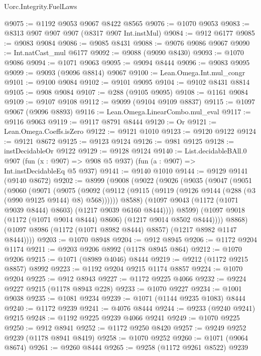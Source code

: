 \begin{lexlean}{Uorc.Integrity.FuelLaws}
\begin{coremodule}
@9075 := @1192 @9053 @9067 @8422 @8565
@9076 := @1070 @9053
@9083 := @8313 @907 @907 @907 (@8317 @907 Int.instMul)
@9084 := @912 @6177
@9085 := @9083 @9084
@9086 := @9085 @8431
@9088 := @9076 @9086 @9067
@9090 := Int.natCast_mul @6177
@9092 := @9088 (@9090 @8430)
@9093 := @1070 @9086
@9094 := @1071 @9063
@9095 := @9094 @8444
@9096 := @9083 @9095
@9099 := @9093 (@9096 @8814) @9067
@9100 := Lean.Omega.Int.mul_congr
@9101 := @9100 @9084
@9102 := @9101 @9095
@9104 := @9102 @8431 @8814
@9105 := @908 @9084
@9107 := @288 (@9105 @9095)
@9108 := @1161 @9084
@9109 := @9107 @9108
@9112 := @9099 (@9104 @9109 @8837)
@9115 := @1097 @9067 (@9096 @8893)
@9116 := Lean.Omega.LinearCombo.mul_eval
@9117 := @9116 @9063
@9119 := @9117 @8791 @8444
@9120 := Or
@9121 := Lean.Omega.Coeffs.isZero
@9122 := @9121 @1010
@9123 := @9120 @9122
@9124 := @9121 @8672
@9125 := @9123 @9124
@9126 := @981 @9125
@9128 := instDecidableOr @9122
@9129 := @9128 @9124
@9140 := List.decidableBAll.{0}
    @907
    (fun (x : @907) => @908 @5 @937)
    (fun (a : @907) => Int.instDecidableEq @5 @937)
@9141 := @9140 @1010
@9144 := @9129 @9141 (@9140 @8672)
@9202 := @8999
    (@9008
      (@9022
        (@9026
          (@9035
            (@9047
              (@9051
                (@9060
                  (@9071
                    (@9075
                      (@9092
                        (@9112
                          (@9115 (@9119 (@9126 @9144 (@288 (@3 (@990 @9125 @9144) @8) @568))))))
                      @8588)
                    (@1097 @9043 (@1172 (@1071 @9039 @8444) @8603) (@1217 @9039 @6160 @8444))))
                @8599)
              (@1097 @9018 (@1172 (@1071 @9014 @8444) @8606) (@1217 @9014 @8502 @8444))))
          @8868)
        (@1097 @8986 (@1172 (@1071 @8982 @8444) @8857) (@1217 @8982 @1147 @8444))))
@9203 := @1070 @8948
@9204 := @912 @8945
@9206 := @1172 @9204 @1174
@9211 := @9203 @9206 @8992 (@1178 @8945 @864)
@9212 := @1070 @9206
@9215 := @1071 (@8989 @4046) @8444
@9219 := @9212 (@1172 @9215 @8857) @8992
@9223 := @1192 @9204 @9215 @1174 @8857
@9224 := @1070 @9204
@9225 := @912 @8943
@9227 := @1172 @9225 @4066
@9232 := @9224 @9227 @9215 (@1178 @8943 @228)
@9233 := @1070 @9227
@9234 := @1001 @9038
@9235 := @1081 @9234
@9239 := @1071 (@1144 @9235 @1083) @8444
@9240 := @1172 @9239
@9241 := @4076 @8444
@9244 := @9233 (@9240 @9241) @9215
@9248 := @1192 @9225 @9239 @4066 @9241
@9249 := @1070 @9225
@9250 := @912 @8941
@9252 := @1172 @9250 @8420
@9257 := @9249 @9252 @9239 (@1178 @8941 @8419)
@9258 := @1070 @9252
@9260 := @1071 (@9064 @8674)
@9261 := @9260 @8444
@9265 := @9258 (@1172 @9261 @8522) @9239

\end{coremodule}
\end{lexlean}
